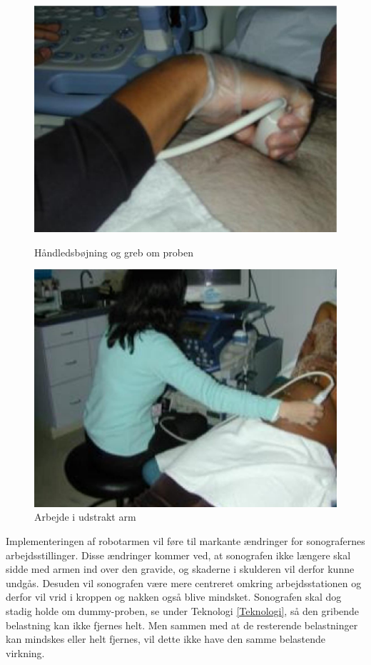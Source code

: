 \begin{figure}[H]
  \begin{minipage}{0.49\textwidth}
    \centering
      \includegraphics[width=\textwidth]{Figurer/wrist.jpg}
      \caption{Håndledsbøjning og greb om proben \cite{31}}
    \label{wrist}
  \end{minipage}
  \hspace{0.02\textwidth}
  \begin{minipage}{0.47\textwidth}
    \centering
      \includegraphics[width=\textwidth]{Figurer/arm.jpg}
      \caption{Arbejde i udstrakt arm \cite{31}}
    \label{udstraktArm}
  \end{minipage}
\end{figure}
Implementeringen af robotarmen vil føre til markante ændringer for sonografernes arbejdsstillinger. Disse ændringer kommer ved, at sonografen ikke længere skal sidde med armen ind over den gravide, og skaderne i skulderen vil derfor kunne undgås. Desuden vil sonografen være mere centreret omkring arbejdsstationen og derfor vil vrid i kroppen og nakken også blive mindsket. Sonografen skal dog stadig holde om dummy-proben, se under Teknologi \ref{Teknologi}, så den gribende belastning kan ikke fjernes helt. Men sammen med at de resterende belastninger kan mindskes eller helt fjernes, vil dette ikke have den samme belastende virkning. 


